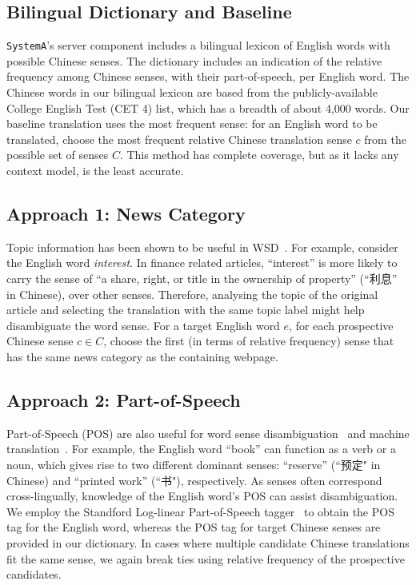 \begin{CJK}{UTF8}{gbsn}
\subsection{Bilingual Dictionary and Baseline}

{\tt SystemA}'s server component includes a bilingual lexicon of
English words with possible Chinese senses.  The dictionary includes
an indication of the relative frequency among Chinese senses, with
their part-of-speech, per English word. The Chinese words in our
bilingual lexicon are based from the publicly-available College
English Test (CET 4) list, which has a breadth of about 4,000 words.
Our baseline translation uses the most frequent sense: for an English
word to be translated, choose the most frequent relative Chinese
translation sense $c$ from the possible set of senses $C$. This method
has complete coverage, but as it lacks any context model, is the least
accurate.

\subsection{Approach 1: News Category}
Topic information has been shown to be useful in
WSD~\cite{Boyd-Graber2007}.  For example, consider the English word
\textit{interest}. In finance related articles, ``interest'' is more
likely to carry the sense of ``a share, right, or title in the
ownership of property'' (``利息'' in Chinese), over other senses.
Therefore, analysing the topic of the original article and selecting
the translation with the same topic label might help disambiguate the
word sense. For a target English word $e$, for each prospective Chinese
sense $c \in C$, choose the first (in terms of relative frequency)
sense that has the same news category as the containing webpage.

\subsection{Approach 2: Part-of-Speech}
Part-of-Speech (POS) are also useful for word sense
disambiguation~\cite{Wilks1998} and machine
translation~\cite{Toutanova2002,Ueffing2003}.  For example, the
English word ``book'' can function as a verb or a noun, which gives
rise to two different dominant senses: ``reserve'' (``预定" in
Chinese) and ``printed work'' (``书"), respectively. As senses often
correspond cross-lingually, knowledge of the English word's POS can
assist disambiguation.  We employ the Standford Log-linear
Part-of-Speech tagger~\cite{Toutanova2003} to obtain the POS tag for
the English word, whereas the POS tag for target Chinese senses are
provided in our dictionary.  In cases where multiple candidate Chinese
translations fit the same sense, we again break ties using relative
frequency of the prospective candidates.


\end{CJK}
